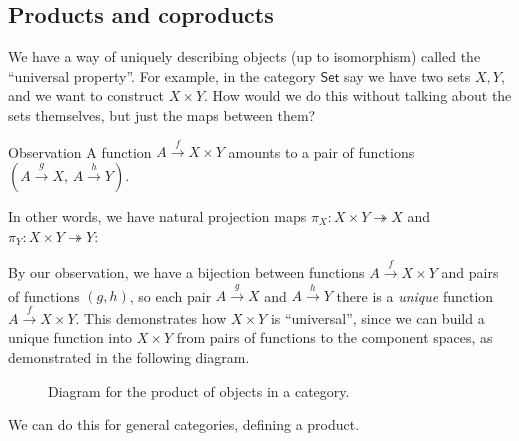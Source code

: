 \subsection{Products and coproducts}
We have a way of uniquely describing objects (up to isomorphism) called the ``universal property''. For example, in the category $\mathsf{Set} $ say we have two sets $X,Y$, and we want to construct $X\times Y$. How would we do this without talking about the sets themselves, but just the maps between them? 
\begin{namedthm}{Observation}
    A function $A \overset{f}{\to } X\times Y$ amounts to a pair of functions $\left( A\overset{g}{\to } X,\, A\overset{h}{\to } Y \right) $. 
\end{namedthm}
In other words, we have natural projection maps $\pi_X \colon X\times Y \twoheadrightarrow X $ and $\pi_Y\colon X\times Y\twoheadrightarrow Y$:
\begin{figure}[H]
\centering
{}
\end{figure}
By our observation, we have a bijection between functions $A \overset{f}{\to } X\times Y       $ and pairs of functions $(g,h)$, so each pair $A\overset{g}{\to } X$ and $A\overset{h}{\to } Y$ there is a \emph{unique} function $A\overset{f}{\to }X\times Y $. This demonstrates how $X\times Y$ is ``universal'', since we can build a unique function into $X\times Y$ from pairs of functions to the component spaces, as demonstrated in the following diagram. 
\begin{figure}[H]
\centering
{}
\caption{Diagram for the product of objects in a category.}
\label{prod}
\end{figure}We can do this for general categories, defining a product.

